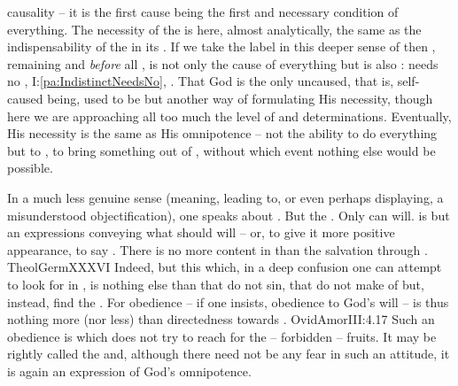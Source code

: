  causality -- it is the first cause being the first and necessary
condition of everything. The necessity of the  is here, almost
analytically, the same as the indispensability of the  in its
.  If we take the label  in this deeper
sense of  then , remaining
 and {\em before} all , is not only the
cause of everything but is also :  needs no
, I:\ref{pa:IndistinctNeedsNo},
. That God is the only 
  uncaused, that is, self-caused being, 
used to be but another way of formulating His necessity, though here we are
approaching all too much the level of  and 
determinations.  Eventually, His necessity is the same as His omnipotence -- not
the ability to do everything but to , to bring something out of
, without which event nothing else would be possible.

\pa In a much less genuine sense (meaning, leading to, or even perhaps
displaying, a misunderstood {objectification}), one speaks 
about .
But the . Only  can will.
 is but an expressions conveying what  should will --
 or, to give it more positive appearance, to say \yes. There is no
more content in  than the salvation through .
\citet{Sin is nothing else than that the creature willeth otherwise than God
  willeth, and contrary to Him.}{TheolGerm}{XXXVI} Indeed, but this  which, in a deep confusion one can attempt to look for in , is nothing else than that  do not sin, that  do not make
 of  but, instead, find the .  For
  obedience -- if
one insists, obedience to God's will -- is thus nothing more (nor less) than
directedness towards \Yes.  \citet{We strive always for the forbidden, and we
  desire things denied.}{OvidAmor}{III:4.17} Such an obedience is 
which does not try to reach for the  -- forbidden -- fruits. It
may be rightly called the  and, although there need not be any
 fear in such an attitude, it is again an expression of God's
omnipotence.  

